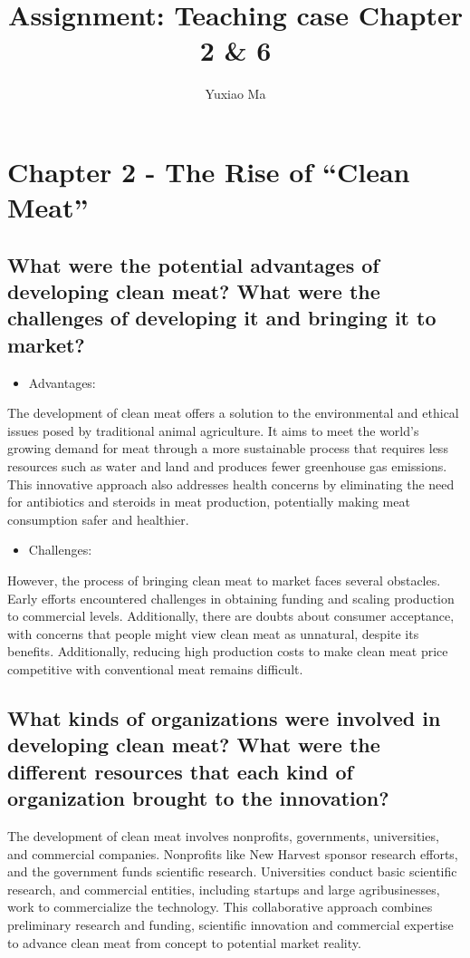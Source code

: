 \documentclass[UTF8,a4paper,AutoFakeBold,AutoFakeSlant]{article}
\title{\textbf{\textsf{{\textsf{Assignment: Teaching case Chapter 2 \& 6}}}}}
\author{\tnewroman Yuxiao Ma}
\date{}
\begin{document}
\maketitle


\section{Chapter 2 - The Rise of “Clean Meat”}

\subsection{What were the potential advantages of developing clean meat? What were the challenges of developing it and bringing it to market?}

\begin{itemize}
    \item Advantages:
\end{itemize}
The development of clean meat offers a solution to the environmental and ethical issues posed by traditional animal agriculture. It aims to meet the world's growing demand for meat through a more sustainable process that requires less resources such as water and land and produces fewer greenhouse gas emissions. This innovative approach also addresses health concerns by eliminating the need for antibiotics and steroids in meat production, potentially making meat consumption safer and healthier.


\begin{itemize}
    \item Challenges:
\end{itemize}
However, the process of bringing clean meat to market faces several obstacles. Early efforts encountered challenges in obtaining funding and scaling production to commercial levels. Additionally, there are doubts about consumer acceptance, with concerns that people might view clean meat as unnatural, despite its benefits. Additionally, reducing high production costs to make clean meat price competitive with conventional meat remains difficult. 


\subsection{What kinds of organizations were involved in developing clean meat? What were the different resources that each kind of organization brought to the innovation?}

The development of clean meat involves nonprofits, governments, universities, and commercial companies. Nonprofits like New Harvest sponsor research efforts, and the government funds scientific research. Universities conduct basic scientific research, and commercial entities, including startups and large agribusinesses, work to commercialize the technology. This collaborative approach combines preliminary research and funding, scientific innovation and commercial expertise to advance clean meat from concept to potential market reality.
\end{document}
